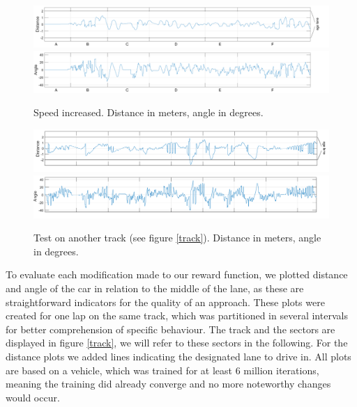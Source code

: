 \begin{figure}[!t]
\centering
\includegraphics[scale=0.265]{../plots/dist_eval_log_smooth_serpentine_10speed}
\vspace{0.5em}
\includegraphics[scale=0.265]{../plots/ang_eval_log_smooth_serpentine_10speed}
\vspace{-2.25em}
\caption{Speed increased. Distance in meters, angle in degrees.}
\label{smooth10}
\vspace{1em}
\includegraphics[scale=0.265]{../plots/dist_eval_log_track_andre_06speed}
\vspace{0.5em}
\includegraphics[scale=0.265]{../plots/ang_eval_log_track_andre_06speed}
\vspace{-2.25em}
\caption{Test on another track (see figure \ref{track}). Distance in meters, angle in degrees.}
\label{andretrack}
\end{figure}

To evaluate each modification made to our reward function, we plotted distance and angle of the car in relation to the middle of the lane, as these are straightforward indicators for the quality of an approach. These plots were created for one lap on the same track, which was partitioned in several intervals for better comprehension of specific behaviour. The track and the sectors are displayed in figure \ref{track}, we will refer to these sectors in the following. For the distance plots we added lines indicating the designated lane to drive in. All plots are based on a vehicle, which was trained for at least 6 million iterations, meaning the training did already converge and no more noteworthy changes would occur. 


